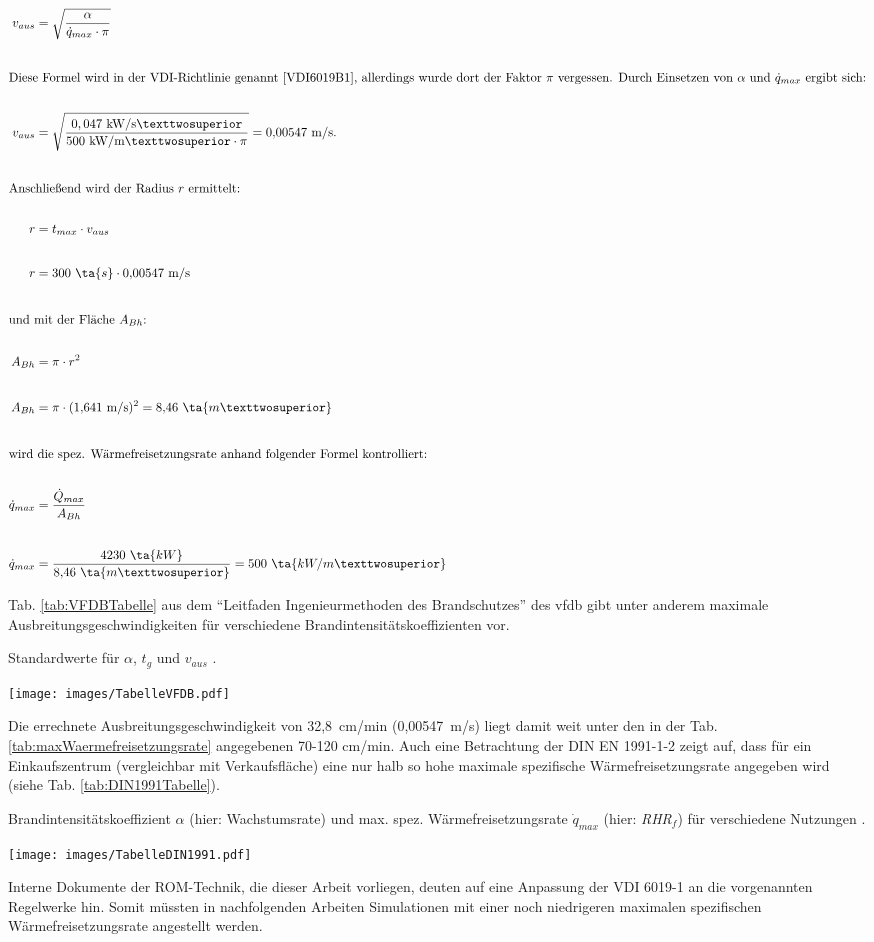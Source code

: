 \begin{align}
    v_{aus} &= \sqrt{\frac{\alpha}{\Dot{q}_{max}\cdot \pi}} \\[20pt]
    \intertext{Diese Formel wird in der VDI-Richtlinie genannt \cite[S.13]{VDI6019B1}, allerdings wurde dort der Faktor $\pi$ vergessen. Durch Einsetzen von $\alpha$ und $\Dot{q}_{max}$ ergibt sich:} \nonumber\\
    v_{aus} &= \sqrt{\frac{0,047~\text{kW/s²}}{500~\text{kW/m²}\cdot \pi}}=0{,}00547~\text{m/s}. \\[20pt]
    \intertext{Anschließend wird der Radius $r$ ermittelt:} \nonumber\\
    r&= t_{max} \cdot v_{aus} \\[20pt]
    r&= 300~\ta{s} \cdot 0{,}00547~\text{m/s} \\[20pt]
    \intertext{und mit der Fläche $A_{Bh}$:} \nonumber\\
    A_{Bh}&=\pi \cdot r^2\\[20pt]
    A_{Bh}&=\pi \cdot (1{,}641~\text{m/s})^2 = 8{,}46~\ta{m²} \\[20pt]
    \intertext{wird die spez. Wärmefreisetzungsrate anhand folgender Formel kontrolliert:} \nonumber\\
    \Dot{q}_{max}&=\frac{\Dot{Q}_{max}}{A_{Bh}}\\[20pt]
    \Dot{q}_{max}&=\frac{4230~\ta{kW}}{8{,}46~\ta{m²}}=500~\ta{kW/m²}
\end{align}

Tab. \ref{tab:VFDBTabelle} aus dem "`Leitfaden Ingenieurmethoden des Brandschutzes"' des vfdb \cite{vfdb2013} gibt unter anderem maximale Ausbreitungsgeschwindigkeiten für verschiedene Brand\-in\-ten\-si\-täts\-ko\-ef\-fi\-zien\-ten vor. 
\begin{table}[h]
    \caption{Standardwerte für $\alpha$, $t_g$ und $v_{aus}$ \cite{vfdb2013}.}
    \centering
    \texttt{[image: images/TabelleVFDB.pdf]}
    \label{tab:VFDBTabelle}
\end{table}
Die errechnete Ausbreitungsgeschwindigkeit von 32,8~cm/min (0,00547~m/s) liegt damit weit unter den in der Tab. \ref{tab:maxWaermefreisetzungsrate} angegebenen 70-120 cm/min. Auch eine Betrachtung der DIN EN 1991-1-2 zeigt auf, dass für ein Einkaufszentrum (vergleichbar mit Verkaufsfläche) eine nur halb so hohe maximale spezifische Wärmefreisetzungsrate angegeben wird (siehe Tab. \ref{tab:DIN1991Tabelle}). 
\begin{table}
    \caption{Brandintensitätskoeffizient $\alpha$ (hier: Wachstumsrate) und max. spez. Wärmefreisetzungsrate $\Dot{q}_{max}$ (hier: \emph{RHR}$_f$) für verschiedene Nutzungen \cite{DIN1991}.}
    \centering
    \texttt{[image: images/TabelleDIN1991.pdf]}
    \label{tab:DIN1991Tabelle}
\end{table}
Interne Dokumente der ROM-Technik, die dieser Arbeit vorliegen, deuten auf eine Anpassung der VDI 6019-1 an die vorgenannten Regelwerke hin. Somit müssten in nachfolgenden Arbeiten Simulationen mit einer noch niedrigeren maximalen spezifischen Wärmefreisetzungsrate angestellt werden.

